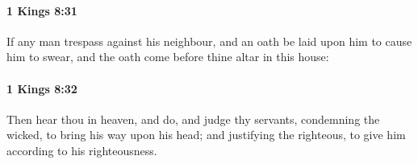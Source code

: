 		\paragraph{1 Kings 8:31} %
			\label{1KINGS-8-31}

			If any man trespass against his neighbour, and an oath be laid upon him to cause him to swear, and the oath come before thine altar in this house:


		\paragraph{1 Kings 8:32} %
			\label{1KINGS-8-32}

			Then hear thou in heaven, and do, and judge thy servants, condemning the wicked, to bring his way upon his head; and justifying the righteous, to give him according to his righteousness.



